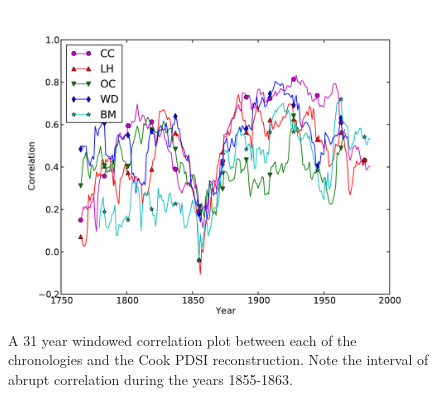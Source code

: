 \begin{figure}
\centering
\includegraphics[width=6in]{figures/cookPdsiRunningCorr.pdf}
\caption{A 31 year windowed correlation plot between each of the chronologies and the Cook PDSI reconstruction. Note the interval of abrupt correlation during the years 1855-1863.}
\label{fig:cookRunningPdsiCorr}
\end{figure}

